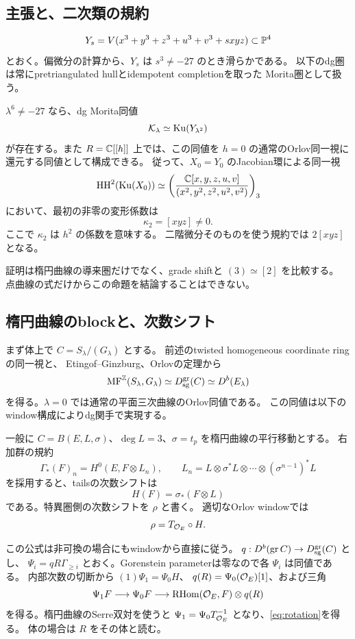 \subsection{主張と、二次類の規約}

\[
 Y_s=V(x^3+y^3+z^3+u^3+v^3+sxyz)\subset\mathbb P^4
\]
とおく。偏微分の計算から、$Y_s$ は $s^3\ne-27$ のとき滑らかである。
以下のdg圏は常にpretriangulated hullとidempotent completionを取った
Morita圏として扱う。

\begin{theorem}[Hesse比較]\label{thm:hesse}
$\lambda^6\ne-27$ なら、dg Morita同値
\[
 \mathcal K_\lambda\simeq\operatorname{Ku}(Y_{\lambda^2})
\]
が存在する。また $R=\mathbb C[[h]]$ 上では、この同値を
$h=0$ の通常のOrlov同一視に還元する同値として構成できる。
従って、$X_0=Y_0$ のJacobian環による同一視
\[
 \operatorname{HH}^2(\operatorname{Ku}(X_0))\simeq
 \left(\frac{\mathbb C[x,y,z,u,v]}{(x^2,y^2,z^2,u^2,v^2)}\right)_3
\]
において、最初の非零の変形係数は
\[
 \boxed{\kappa_2=[xyz]\ne0.}
\]
ここで $\kappa_2$ は $h^2$ の係数を意味する。
二階微分そのものを使う規約では $2[xyz]$ となる。
\end{theorem}

証明は楕円曲線の導来圏だけでなく、grade shiftと $(3)\simeq[2]$ を比較する。
点曲線の式だけからこの命題を結論することはできない。

\subsection{楕円曲線のblockと、次数シフト}

まず体上で $C=S_\lambda/(G_\lambda)$ とする。
前述のtwisted homogeneous coordinate ringの同一視と、
Etingof--Ginzburg\cite[Theorem 3.6.2]{EG}、Orlovの定理から
\[
 \operatorname{MF}^{\mathbb Z}(S_\lambda,G_\lambda)
 \simeq D_{\mathrm{sg}}^{\mathrm{gr}}(C)\simeq D^b(E_\lambda)
\]
を得る。$\lambda=0$ では通常の平面三次曲線のOrlov同値である。
この同値は以下のwindow構成によりdg関手で実現する。

一般に $C=B(E,L,\sigma)$、$\deg L=3$、$\sigma=t_p$ を楕円曲線の平行移動とする。
右加群の規約
\[
 \Gamma_*(F)_n=H^0(E,F\otimes L_n),\qquad
 L_n=L\otimes\sigma^*L\otimes\cdots\otimes(\sigma^{n-1})^*L
\]
を採用すると、tailsの次数シフトは
\[
 H(F)=\sigma_*(F\otimes L)
\]
である。特異圏側の次数シフトを $\rho$ と書く。
適切なOrlov windowでは
\begin{equation}\label{eq:rotation}
 \rho=T_{\mathcal O_E}\circ H.
\end{equation}

この公式は非可換の場合にもwindowから直接に従う。
$q:D^b(\operatorname{gr}C)\to D_{\mathrm{sg}}^{\mathrm{gr}}(C)$ とし、
$\Psi_i=qR\Gamma_{\ge i}$ とおく。Gorenstein parameterは零なので各 $\Psi_i$ は同値である。
内部次数の切断から $(1)\Psi_1=\Psi_0H$、
$q(R)=\Psi_0(\mathcal O_E)[1]$、および三角
\[
 \Psi_1F\longrightarrow\Psi_0F\longrightarrow
 \operatorname{RHom}(\mathcal O_E,F)\otimes q(R)
\]
を得る。楕円曲線のSerre双対を使うと
$\Psi_1=\Psi_0T_{\mathcal O_E}^{-1}$ となり、\eqref{eq:rotation}を得る。
体の場合は $R$ をその体と読む。

